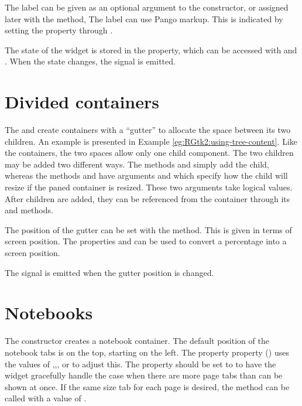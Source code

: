 The label can be given as an optional argument to the constructor, or
assigned later with the  method, The label can use
Pango markup. This is indicated by setting the 
property  through . 

The state of the widget is stored in the  property,
which can be accessed with  and
. 
When the state changes, the  signal is emitted.

\section{Divided containers}
\label{sec:RGtk2:gtkPanedWindow}

The  and  create
containers with a ``gutter'' to allocate the space between its two
children. An example is presented in Example
\ref{eg:RGtk2:using-tree-content}. Like the  containers,
the two spaces allow only one child component. The two children may be
added two different ways. The methods  and
 simply add the child, whereas the methods
 and  have arguments
 and 
which specify how the child will resize if the paned container is
resized. These two arguments take logical values.  After children are
added, they can be referenced from the container through its
 and  methods.

The position of the gutter can be set with the
 method. This is given in terms of
screen position. The
properties  and  can be used to
convert a percentage into a screen position.

The  signal is emitted when the gutter position is
changed. 



\section{Notebooks}
\label{sec:RGtk2:gtkNotebook}

The  constructor creates a notebook container. The
default position of the notebook tabs is on the top, starting on the
left. The property  property
() uses the 
values of ,,, or  to adjust this. The
property  should be set to  to have the
widget gracefully handle the case when there are more page tabs than
can be shown at once. If the same size tab for each page is desired,
the method  can be called with
a value of . 


